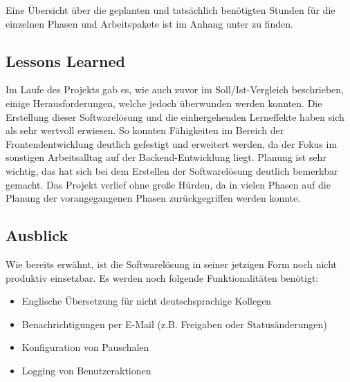 Eine Übersicht über die geplanten und tatsächlich benötigten Stunden für die einzelnen Phasen und Arbeitspakete ist im Anhang unter  zu finden.

\subsection{Lessons Learned}
\label{sec:Abschlussphase:Lessons Learned}

Im Laufe des Projekts gab es, wie auch zuvor im Soll/Ist-Vergleich beschrieben, einige Herausforderungen, welche jedoch überwunden werden konnten. Die Erstellung dieser Softwarelösung und die einhergehenden Lerneffekte haben sich als sehr wertvoll erwiesen. So konnten Fähigkeiten im Bereich der Frontendentwicklung deutlich gefestigt und erweitert werden, da der Fokus im sonstigen Arbeitsalltag auf der Backend-Entwicklung liegt. Planung ist sehr wichtig, das hat sich bei dem Erstellen der Softwarelösung deutlich bemerkbar gemacht. Das Projekt verlief ohne große Hürden, da in vielen Phasen auf die Planung der vorangegangenen Phasen zurückgegriffen werden konnte.

\subsection{Ausblick}
\label{sec:Abschlussphase:Ausblick}
Wie bereits erwähnt, ist die Softwarelösung in seiner jetzigen Form noch nicht produktiv einsetzbar. Es werden noch folgende Funktionalitäten benötigt:

\begin{itemize}
    \item Englische Übersetzung für nicht deutschsprachige Kollegen
    \item Benachrichtigungen per E-Mail (z.B. Freigaben oder Statusänderungen)
    \item Konfiguration von Pauschalen
    \item Logging von Benutzeraktionen
\end{itemize}
